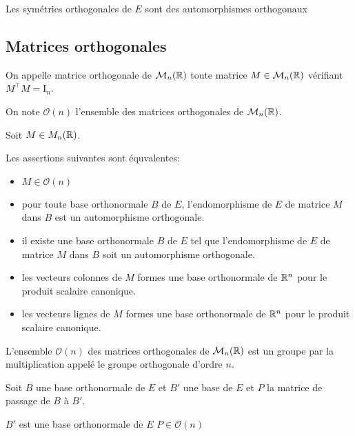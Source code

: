 \begin{prp}
Les symétries orthogonales de $E$ sont des automorphismes orthogonaux
\end{prp}

\subsection{Matrices orthogonales}

\begin{dfn}
On appelle matrice orthogonale de $\operatorname{\mathcal{M}}_n(\mathbb{R})$ toute matrice
$M \in \operatorname{\mathcal{M}}_n(\mathbb{R})$ vérifiant $M^\intercal M = \mathrm{I}_n$.

On note $\mathcal{O}(n)$ l'ensemble des matrices orthogonales de
$\operatorname{\mathcal{M}}_n(\mathbb{R})$.
\end{dfn}

\begin{prp}
Soit $M \in M_n(\mathbb{R})$.

Les assertions suivantes sont équvalentes:
\begin{itemize}
    \item $M \in \mathcal{O}(n)$
    \item pour toute base orthonormale $B$ de $E$, l'endomorphisme de $E$
        de matrice $M$ dans $B$ est un automorphisme orthogonale.
    \item il existe une base orthonormale $B$ de $E$ tel que
        l'endomorphisme de $E$ de matrice $M$ dans $B$ soit un
        automorphisme orthogonale.
    \item les vecteurs colonnes de $M$ formes une base orthonormale
        de $\mathbb{R}^n$ pour le produit scalaire canonique.
    \item les vecteurs lignes de $M$ formes une base orthonormale
        de $\mathbb{R}^n$ pour le produit scalaire canonique.
\end{itemize}
\end{prp}

\begin{prp}
L'ensemble $\mathcal{O}(n)$ des matrices orthogonales de $\operatorname{\mathcal{M}}_n(\mathbb{R})$
est un groupe par la multiplication appelé le groupe orthogonale
d'ordre $n$.
\end{prp}

\begin{prp}
Soit $B$ une base orthonormale de $E$ et $B'$ une base de $E$ et
$P$ la matrice de passage de $B$ à $B'$.

$B'$ est une base orthonormale de $E$ \ssi $P \in \mathcal{O}(n)$
\end{prp}

